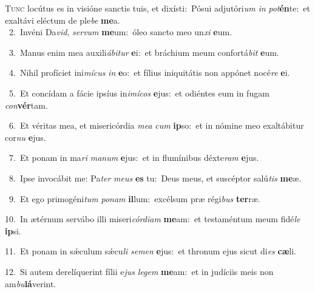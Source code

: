 \lettrine{\initial\textcolor{\initialcolor}{T}}{unc} locútus es in visióne sanctis tuis, et dixísti:~\dagger Pósui adjutóri\textit{um} \textit{in} \textit{pot}\-\textbf{én}te:~\star et exaltávi eléctum de ple\textit{be} \textbf{me}\-a.\\
{\numbfont\textcolor{\numbcolor}{~2.}}~Invéni Da\-\textit{vid}\-, \textit{ser}\-\textit{vum} \textbf{me}\-um:~\star óleo sancto meo un\textit{xi} \textbf{e}\-um.\par
{\numbfont\textcolor{\numbcolor}{~3.}}~Manus enim mea auxili\-\textit{á}\-\textit{bi}\textit{tur} \textbf{e}\-i:~\star et bráchium meum confortá\textit{bit} \textbf{e}\-um.\par
{\numbfont\textcolor{\numbcolor}{~4.}}~Nihil profíciet ini\-\textit{mí}\-\textit{cus} \textit{in} \textbf{e}\-o:~\star et fílius iniquitátis non appónet nocé\textit{re} \textbf{e}\-i.\par
{\numbfont\textcolor{\numbcolor}{~5.}}~Et concídam a fácie ipsíus in\-\textit{i}\-\textit{mí}\textit{cos} \textbf{e}\-jus:~\star et odiéntes eum in fugam \textit{con}\-\textbf{vér}tam.\par
{\numbfont\textcolor{\numbcolor}{~6.}}~Et véritas mea, et misericórdia \textit{me}\-\textit{a} \textit{cum} \textbf{ip}\-so:~\star et in nómine meo exaltábitur cor\textit{nu} \textbf{e}\-jus.\par
{\numbfont\textcolor{\numbcolor}{~7.}}~Et ponam in ma\textit{ri} \textit{ma}\-\textit{num} \textbf{e}\-jus:~\star et in flumínibus déxte\textit{ram} \textbf{e}\-jus.\par
{\numbfont\textcolor{\numbcolor}{~8.}}~Ipse invocábit me: Pa\textit{ter} \textit{me}\-\textit{us} \textbf{es} tu:~\star Deus meus, et suscéptor salú\textit{tis} \textbf{me}\-æ.\par
{\numbfont\textcolor{\numbcolor}{~9.}}~Et ego primogéni\textit{tum} \textit{po}\-\textit{nam} \textbf{il}\-lum:~\star excélsum præ régi\textit{bus} \textbf{ter}\-ræ.\par
{\numbfont\textcolor{\numbcolor}{10.}}~In ætérnum servábo illi miseri\-\textit{cór}\-\textit{di}\textit{am} \textbf{me}\-am:~\star et testaméntum meum fidé\textit{le} \textbf{ip}\-si.\par
{\numbfont\textcolor{\numbcolor}{11.}}~Et ponam in sǽculum sǽcu\textit{li} \textit{se}\-\textit{men} \textbf{e}\-jus:~\star et thronum ejus sicut di\textit{es} \textbf{cæ}\-li.\par
{\numbfont\textcolor{\numbcolor}{12.}}~Si autem derelíquerint fílii e\textit{jus} \textit{le}\-\textit{gem} \textbf{me}\-am:~\star et in judíciis meis non am\-\textit{bu}\-\textbf{lá}verint.\par
